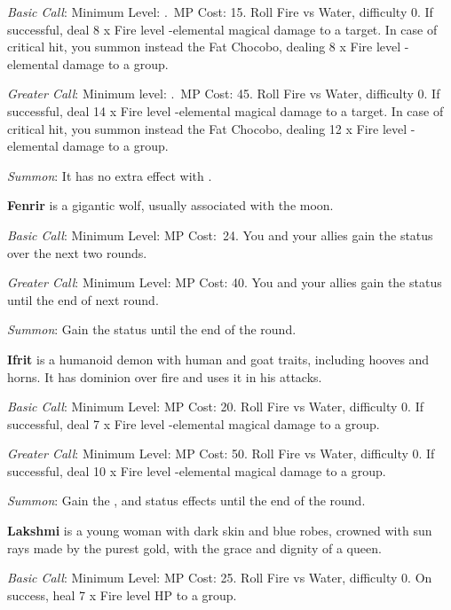 \begin{multicols}{2}
    \textit{Basic Call}: Minimum Level: .\ MP Cost: 15. Roll Fire vs Water, difficulty 0. If successful, deal 8 x Fire level -elemental magical damage to a target. In case of critical hit, you summon instead the Fat Chocobo, dealing 8 x Fire level -elemental damage to a group.
    
    \textit{Greater Call}: Minimum level: .\ MP Cost: 45. Roll Fire vs Water, difficulty 0. If successful, deal 14 x Fire level -elemental magical damage to a target. In case of critical hit, you summon instead the Fat Chocobo, dealing 12 x Fire level -elemental damage to a group.
    
	\textit{Summon}: It has no extra effect with .
    
    \textbf{Fenrir} is a gigantic wolf, usually associated with the moon.

	\textit{Basic Call}: Minimum Level:  MP Cost:\ 24. You and your allies gain the  status over the next two rounds.
    
    \textit{Greater Call}: Minimum Level:  MP Cost: 40. You and your allies gain the  status until the end of next round.
    
    \textit{Summon}: Gain the  status until the end of the round.

    \textbf{Ifrit} is a humanoid demon with human and goat traits, including hooves and horns. It has dominion over fire and uses it in his attacks.
    
    \textit{Basic Call}: Minimum Level:  MP Cost: 20. Roll Fire vs Water, difficulty 0. If successful, deal 7 x Fire level -elemental magical damage to a group.
    
    \textit{Greater Call}: Minimum Level:  MP Cost: 50. Roll Fire vs Water, difficulty 0. If successful, deal 10 x Fire level -elemental magical damage to a group.
    
	\textit{Summon}: Gain the  ,   and   status effects until the end of the round.
    
    \textbf{Lakshmi} is a young woman with dark skin and blue robes, crowned with sun rays made by the purest gold, with the grace and dignity of a queen.

    \textit{Basic Call}: Minimum Level:  MP Cost: 25. Roll Fire vs Water, difficulty 0. On success, heal 7 x Fire level HP to a group.
    

\end{multicols}
